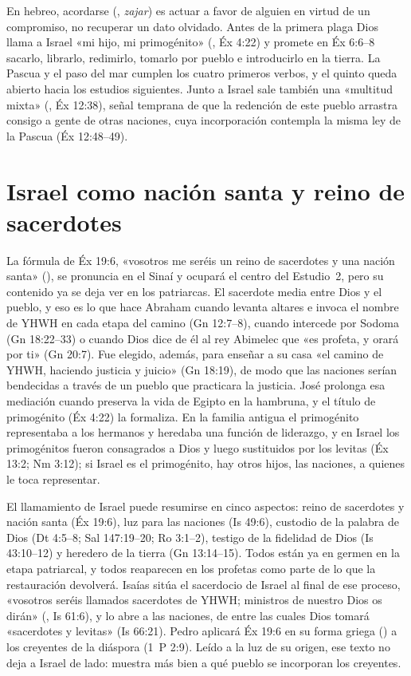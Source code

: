 En hebreo, acordarse (, \emph{zajar}) es actuar a favor de alguien en virtud de un compromiso, no recuperar un dato olvidado. Antes de la primera plaga Dios llama a Israel «mi hijo, mi primogénito» (, Éx 4:22) y promete en Éx 6:6–8 sacarlo, librarlo, redimirlo, tomarlo por pueblo e introducirlo en la tierra. La Pascua y el paso del mar cumplen los cuatro primeros verbos, y el quinto queda abierto hacia los estudios siguientes. Junto a Israel sale también una «multitud mixta» (, Éx 12:38), señal temprana de que la redención de este pueblo arrastra consigo a gente de otras naciones, cuya incorporación contempla la misma ley de la Pascua (Éx 12:48–49).

\section{Israel como nación santa y reino de sacerdotes}

La fórmula de Éx 19:6, «vosotros me seréis un reino de sacerdotes y una nación santa» (), se pronuncia en el Sinaí y ocupará el centro del Estudio~2, pero su contenido ya se deja ver en los patriarcas. El sacerdote media entre Dios y el pueblo, y eso es lo que hace Abraham cuando levanta altares e invoca el nombre de YHWH en cada etapa del camino (Gn 12:7–8), cuando intercede por Sodoma (Gn 18:22–33) o cuando Dios dice de él al rey Abimelec que «es profeta, y orará por ti» (Gn 20:7). Fue elegido, además, para enseñar a su casa «el camino de YHWH, haciendo justicia y juicio» (Gn 18:19), de modo que las naciones serían bendecidas a través de un pueblo que practicara la justicia. José prolonga esa mediación cuando preserva la vida de Egipto en la hambruna, y el título de primogénito (Éx 4:22) la formaliza. En la familia antigua el primogénito representaba a los hermanos y heredaba una función de liderazgo, y en Israel los primogénitos fueron consagrados a Dios y luego sustituidos por los levitas (Éx 13:2; Nm 3:12); si Israel es el primogénito, hay otros hijos, las naciones, a quienes le toca representar.

El llamamiento de Israel puede resumirse en cinco aspectos: reino de sacerdotes y nación santa (Éx 19:6), luz para las naciones (Is 49:6), custodio de la palabra de Dios (Dt 4:5–8; Sal 147:19–20; Ro 3:1–2), testigo de la fidelidad de Dios (Is 43:10–12) y heredero de la tierra (Gn 13:14–15). Todos están ya en germen en la etapa patriarcal, y todos reaparecen en los profetas como parte de lo que la restauración devolverá. Isaías sitúa el sacerdocio de Israel al final de ese proceso, «vosotros seréis llamados sacerdotes de YHWH; ministros de nuestro Dios os dirán» (, Is 61:6), y lo abre a las naciones, de entre las cuales Dios tomará «sacerdotes y levitas» (Is 66:21). Pedro aplicará Éx 19:6 en su forma griega () a los creyentes de la diáspora (1~P 2:9). Leído a la luz de su origen, ese texto no deja a Israel de lado: muestra más bien a qué pueblo se incorporan los creyentes.

